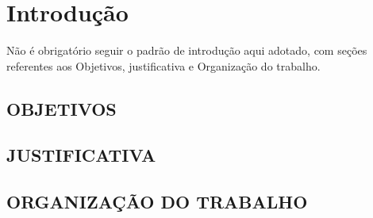 \chapter{Introdução}

Não é obrigatório seguir o padrão de introdução aqui adotado, com seções referentes aos Objetivos, justificativa e Organização do trabalho.

\section{OBJETIVOS}

\section{JUSTIFICATIVA}

\section{ORGANIZAÇÃO DO TRABALHO}

